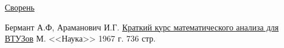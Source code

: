 \begin{thebibliography}{99}

\href{https://drive.google.com/file/d/0B0u4WeMjO894YzEtMEFFY3FXSDQ/edit?usp=sharing}{Сворень}

Бермант А.Ф, Араманович И.Г.
\href{https://drive.google.com/file/d/0B0u4WeMjO894RnU2YU5ldUE5eW8/edit?usp=sharing}{Краткий
курс математического анализа для ВТУЗов}
М. <<Наука>>
1967 г.
736 стр.

\end{thebibliography}

